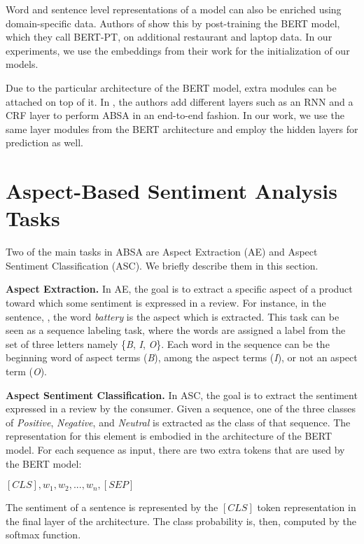 \documentclass{article}
\begin{document}
Word and sentence level representations of a model can also be enriched using domain-specific data. Authors of \cite{xu2019bert} show this by post-training the BERT model, which they call BERT-PT, on additional restaurant and laptop data. In our experiments, we use the embeddings from their work for the initialization of our models. 

Due to the particular architecture of the BERT model, extra modules can be attached on top of it. In \cite{li2019exploiting}, the authors add different layers such as an RNN and a CRF layer to perform ABSA in an end-to-end fashion. In our work, we use the same layer modules from the BERT architecture and employ the hidden layers for prediction as well. 

\section{Aspect-Based Sentiment Analysis Tasks}

Two of the main tasks in ABSA are Aspect Extraction (AE) and Aspect Sentiment Classification (ASC). We briefly describe them in this section. 

\textbf{Aspect Extraction.}
In AE, the goal is to extract a specific aspect of a product toward which some sentiment is expressed in a review. For instance, in the sentence, , the word \textit{battery} is the aspect which is extracted. This task can be seen as a sequence labeling task, where the words are assigned a label from the set of three letters namely \{\textit{B}, \textit{I}, \textit{O}\}.  Each word in the sequence can be the beginning word of aspect terms (\textit{B}), among the aspect terms (\textit{I}), or not an aspect term (\textit{O}). 

\textbf{Aspect Sentiment Classification.}
In ASC, the goal is to extract the sentiment expressed in a review by the consumer. Given a sequence, one of the three classes of \textit{Positive}, \textit{Negative}, and \textit{Neutral} is extracted as the class of that sequence. The representation for this element is embodied in the architecture of the BERT model. For each sequence as input, there are two extra tokens that are used by the BERT model:
\begin{center}
	$[CLS], w_1, w_2, ..., w_n, [SEP]$
\end{center}
The sentiment of a sentence is represented by the $[CLS]$ token representation in the final layer of the architecture. The class probability is, then, computed by the softmax function. 
\end{document}
